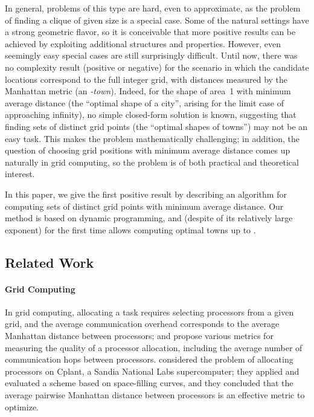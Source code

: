\documentclass[preprint,authoryear,12pt]{elsarticle}
\begin{document}
In general, problems of this type are hard, even
to approximate, as the problem of finding a clique of given size is a special case. Some of the
natural settings have a strong geometric flavor, so it is conceivable
that more positive results can be achieved by exploiting additional
structures and properties.
However, even seemingly easy
special cases are still surprisingly difficult. Until now, there was no
complexity result (positive or negative) for the scenario in which
the candidate locations correspond to the full integer grid, with distances measured
by the Manhattan metric (an \emph{-town}).
Indeed, for the shape of area~1 with minimum
average  distance (the ``optimal shape of a city'', arising
for the limit case of  approaching infinity), no simple
closed-form solution is known, suggesting that finding sets of  distinct
grid points (the ``optimal shapes of towns'') may not be an easy task.
This makes the problem mathematically challenging; in addition,
the question of choosing  grid positions with minimum
average  distance comes up naturally in grid computing, so
the problem is of both practical and theoretical interest.

In this paper, we give the first positive result by describing
an  algorithm for computing sets of  distinct grid points
with minimum average  distance. Our method is based on dynamic programming,
and (despite of its relatively large exponent) for the first time allows computing optimal
towns up to .

\subsection{Related Work}
\paragraph{Grid Computing}
In grid computing, allocating a task requires selecting  processors from
a given grid,
and the average communication overhead corresponds to
the average Manhattan distance between processors;
\cite{mache96,mache97} and \cite{leung02}
propose various metrics for
measuring the quality of a processor allocation, including the
average number of communication hops between processors.
\cite{leung02} considered the problem of allocating processors
 on Cplant, a Sandia National Labs
supercomputer;
they applied and evaluated a scheme
based on space-filling curves, and
 they concluded that the average pairwise Manhattan
distance between processors is an effective metric to optimize.
\end{document}

